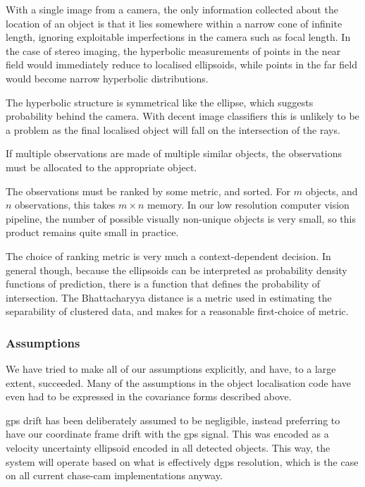 \documentclass[a4paper, 11pt, titlepage]{article}
\newcounter{subsubsubsection}[subsubsection]
\begin{document}
        With a single image from a camera, the only information collected about the location of an object is that it lies somewhere within a narrow cone of infinite length, ignoring exploitable imperfections in the camera such as focal length.
        In the case of stereo imaging, the hyperbolic measurements of points in the near field would immediately reduce to localised ellipsoids, while points in the far field would become narrow hyperbolic distributions.

        The hyperbolic structure is symmetrical like the ellipse, which suggests probability behind the camera.  With decent image classifiers this is unlikely to be a problem as the final localised object will fall on the intersection of the rays.

        If multiple observations are made of multiple similar objects, the observations must be allocated to the appropriate object.

        The observations must be ranked by some metric, and sorted.  For \(m\) objects, and \(n\) observations, this takes \(m \times n\) memory.  In our low resolution computer vision pipeline, the number of possible visually non-unique objects is very small, so this product remains quite small in practice.

        The choice of ranking metric is very much a context-dependent decision.  In general though, because the ellipsoids can be interpreted as probability density functions of prediction, there is a function that defines the probability of intersection. The Bhattacharyya distance is a metric used in estimating the separability of clustered data, and makes for a reasonable first-choice of metric.

    \subsubsection{Assumptions}
      We have tried to make all of our assumptions explicitly, and have, to a large extent, succeeded.
      Many of the assumptions in the object localisation code have even had to be expressed in the covariance forms described above.

      \gls{gps} drift has been deliberately assumed to be negligible, instead preferring to have our coordinate frame drift with the \gls{gps} signal.  This was encoded as a velocity uncertainty ellipsoid encoded in all detected objects.
      This way, the system will operate based on what is effectively \gls{dgps} resolution, which is the case on all current chase-cam implementations anyway.
\end{document}

